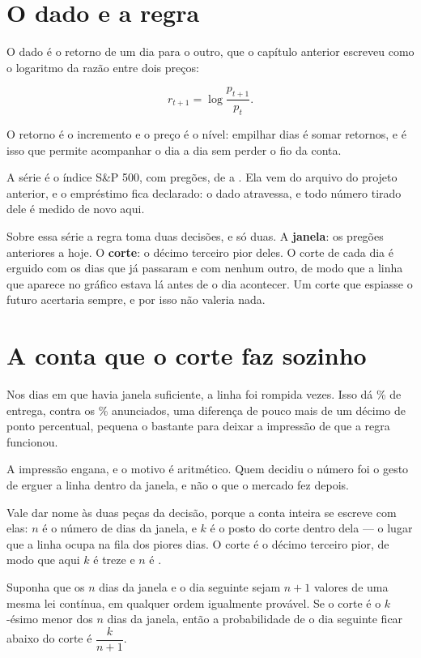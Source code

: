 \section{O dado e a regra}

O dado é o retorno de um dia para o outro, que o capítulo anterior escreveu como o logaritmo
da razão entre dois preços:

\[
  r_{t+1} = \log \frac{p_{t+1}}{p_t}.
\]

O retorno é o incremento e o preço é o nível: empilhar dias é somar retornos, e é isso que
permite acompanhar o dia a dia sem perder o fio da conta.

A série é o índice S\&P 500, %
com \numSerieDias{} pregões, de \numSerieInicio{} a \numSerieFim. Ela vem do arquivo do
projeto anterior, e o empréstimo fica declarado: o dado atravessa, e todo número tirado dele é
medido de novo aqui.

Sobre essa série a regra toma duas decisões, e só duas. A \textbf{janela}: os
\numCorteJanela{} pregões anteriores a hoje. O \textbf{corte}: o décimo terceiro pior deles.
O corte de cada dia é erguido com os dias que já passaram e com nenhum outro, de modo que a
linha que aparece no gráfico estava lá antes de o dia acontecer. Um corte que espiasse o
futuro acertaria sempre, e por isso não valeria nada.

\section{A conta que o corte faz sozinho}

Nos \numEntregaDias{} dias em que havia janela suficiente, a linha foi rompida
\numEntregaViolacoes{} vezes. Isso dá \numEntregaTaxaPct\% de entrega, contra os
\numPromessaPct\% anunciados, uma diferença de pouco mais de um décimo de ponto percentual, pequena o
bastante para deixar a impressão de que a regra funcionou.

A impressão engana, e o motivo é aritmético. Quem decidiu o número foi o gesto de erguer a
linha dentro da janela, e não o que o mercado fez depois.

Vale dar nome às duas peças da decisão, porque a conta inteira se escreve com elas: $n$ é o
número de dias da janela, e $k$ é o posto do corte dentro dela --- o lugar que a linha ocupa na
fila dos piores dias. O corte é o décimo terceiro pior, de modo que aqui $k$ é treze e $n$ é
\numCorteJanela.

\begin{proposicao}
\label{prop:conta}
Suponha que os $n$ dias da janela e o dia seguinte sejam $n+1$ valores de uma mesma lei
contínua, em qualquer ordem igualmente provável. Se o corte é o $k$-ésimo menor dos $n$
dias da janela, então a probabilidade de o dia seguinte ficar abaixo do corte é
$\dfrac{k}{n+1}$.
\end{proposicao}

